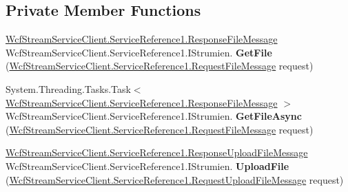 \subsection*{Private Member Functions}
\begin{DoxyCompactItemize}
\item 
\mbox{\label{class_wcf_stream_service_client_1_1_service_reference1_1_1_strumien_client_a5e1a18a08a370f97b9956df898104f55}} 
\hyperlink{class_wcf_stream_service_client_1_1_service_reference1_1_1_response_file_message}{Wcf\+Stream\+Service\+Client.\+Service\+Reference1.\+Response\+File\+Message} Wcf\+Stream\+Service\+Client.\+Service\+Reference1.\+I\+Strumien. {\bfseries Get\+File} (\hyperlink{class_wcf_stream_service_client_1_1_service_reference1_1_1_request_file_message}{Wcf\+Stream\+Service\+Client.\+Service\+Reference1.\+Request\+File\+Message} request)
\item 
\mbox{\label{class_wcf_stream_service_client_1_1_service_reference1_1_1_strumien_client_a4641e657ef223c2665d5d9a7da6ee0c4}} 
System.\+Threading.\+Tasks.\+Task$<$ \hyperlink{class_wcf_stream_service_client_1_1_service_reference1_1_1_response_file_message}{Wcf\+Stream\+Service\+Client.\+Service\+Reference1.\+Response\+File\+Message} $>$ Wcf\+Stream\+Service\+Client.\+Service\+Reference1.\+I\+Strumien. {\bfseries Get\+File\+Async} (\hyperlink{class_wcf_stream_service_client_1_1_service_reference1_1_1_request_file_message}{Wcf\+Stream\+Service\+Client.\+Service\+Reference1.\+Request\+File\+Message} request)
\item 
\mbox{\label{class_wcf_stream_service_client_1_1_service_reference1_1_1_strumien_client_ad803a9da34df259d121cd70f8a797ad7}} 
\hyperlink{class_wcf_stream_service_client_1_1_service_reference1_1_1_response_upload_file_message}{Wcf\+Stream\+Service\+Client.\+Service\+Reference1.\+Response\+Upload\+File\+Message} Wcf\+Stream\+Service\+Client.\+Service\+Reference1.\+I\+Strumien. {\bfseries Upload\+File} (\hyperlink{class_wcf_stream_service_client_1_1_service_reference1_1_1_request_upload_file_message}{Wcf\+Stream\+Service\+Client.\+Service\+Reference1.\+Request\+Upload\+File\+Message} request)
\item 
\mbox{\label{class_wcf_stream_service_client_1_1_service_reference1_1_1_strumien_client_a290e73094678770abd42263025780dac}} 

\end{DoxyCompactItemize}
